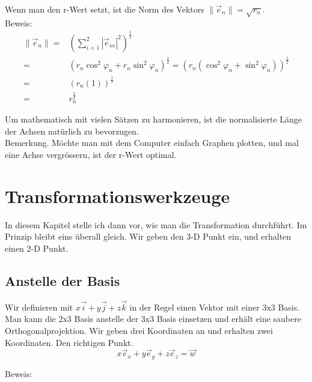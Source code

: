 \documentclass[a4paper]{article}
\begin{document}
Wenn man den r-Wert setzt, ist die Norm des Vektors $\|\vec{e}_n\| = \sqrt{r_n}$.\\

Beweis:\\
\begin{displaymath}
\begin{align}
    \|\vec{e}_n\| =& (\sum_{i=1}^{2}|\vec{e}_{ni}|^2)^{\frac12} \\
    =& (r_n\cos^{2}\varphi_n + r_n\sin^{2}\varphi_n)^{\frac12} = (r_n(\cos^{2}\varphi_n + \sin^{2}\varphi_n))^{\frac12}\\
    =& (r_n(1))^{\frac12} \\
    =& r_n^\frac12
\end{align}
\end{displaymath}

Um mathematisch mit vielen S\"atzen zu harmonieren, ist die normalisierte L\"ange der Achsen nat\"urlich zu bevorzugen.\\

Bemerkung. M\"ochte man mit dem Computer einfach Graphen plotten, und mal eine Achse vergr\"ossern, ist der r-Wert optimal.\\


\section{Transformationswerkzeuge}

In diesem Kapitel stelle ich dann vor, wie man die Transformation durchf\"uhrt. Im Prinzip bleibt eins \"uberall gleich. Wir geben den 3-D Punkt ein, und erhalten einen 2-D Punkt.\\

\subsection{Anstelle der Basis}

Wir definieren mit $x\vec{i}+y\vec{j}+z\vec{k}$ in der Regel einen Vektor mit einer 3x3 Basis. Man kann die 2x3 Basis anstelle der 3x3 Basis einsetzen und erh\"alt eine saubere Orthogonalprojektion. Wir geben drei Koordinaten an und erhalten zwei Koordinaten. Den richtigen Punkt.\\

\begin{displaymath}
x\vec{e}_{x} + y\vec{e}_{y} + z\vec{e}_{z} = \vec{w} 
\end{displaymath}

Beweis:\\
\end{document}

